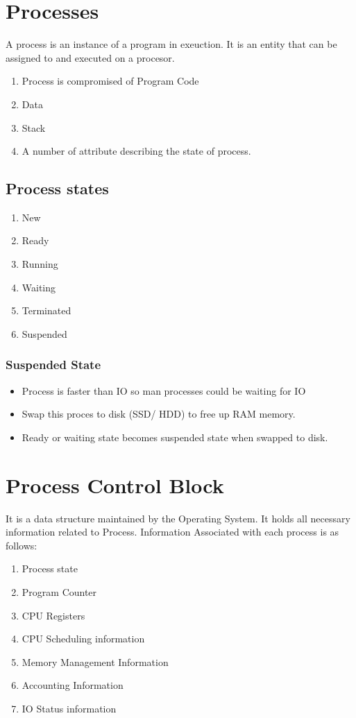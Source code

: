 \documentclass[11pt]{article}
\begin{document}
\clearpage
\tableofcontents
\clearpage


\section{Processes}

A process is an instance of a program in exeuction. It is an entity that can be assigned to and executed on a procesor. 

\begin{enumerate}
    \item Process is compromised of Program Code
    \item Data
    \item Stack
    \item A number of attribute describing the state of process. 
\end{enumerate}

\subsection{Process states}
\begin{enumerate}
    \item New
    \item Ready
    \item Running
    \item Waiting
    \item Terminated
    \item Suspended
\end{enumerate}


\subsubsection{Suspended State}
\begin{itemize}
    \item Process is faster than IO so man processes could be waiting for IO
    \item Swap this proces to disk (SSD/ HDD) to free up RAM memory. 
    \item Ready or waiting state becomes suspended state when swapped to disk. 
\end{itemize}

\section{Process Control Block}
It is a data structure maintained by the Operating System. It holds all necessary information related to Process.
Information Associated with each process is as follows:
\begin{enumerate}
    \item Process state
    \item Program Counter
    \item CPU Registers
    \item CPU Scheduling information
    \item Memory Management Information
    \item Accounting Information
    \item IO Status information
\end{enumerate}
\end{document}
